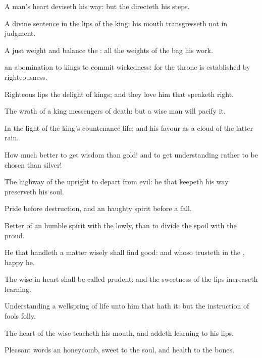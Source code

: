 {A
man’s
heart
deviseth his
way: but the
{}
directeth his
steps.

A divine
sentence
{} in the
lips of the
king: his
mouth
transgresseth not in
judgment.

A
just
weight and
balance
{} the
{}: all the
weights of the
bag
{} his
work.

 an
abomination to
kings to
commit
wickedness: for the
throne is
established by
righteousness.

Righteous
lips
{} the
delight of
kings; and they
love him that
speaketh
right.


\par }{\PP {}The
wrath of a
king
{}
messengers of
death: but a
wise
man will
pacify it.

In the
light of the
king’s
countenance
{}
life; and his
favour
{} as a
cloud of the latter
rain.

How much
better
{} to
get
wisdom than
gold! and to
get
understanding rather to be
chosen than
silver!

The
highway of the
upright
{} to
depart from
evil: he that
keepeth his
way
preserveth his
soul.

Pride
{}
before
destruction, and an
haughty
spirit
before a
fall.

Better
{} of an
humble
spirit with the
lowly, than to
divide the
spoil with the
proud.

He that handleth a
matter
wisely shall
find
good: and whoso
trusteth in the
{},
happy
{} he.

The
wise in
heart shall be
called
prudent: and the
sweetness of the
lips
increaseth
learning.

Understanding
{} a
wellspring of
life unto him that
hath it: but the
instruction of
fools
{}
folly.

The
heart of the
wise
teacheth his
mouth, and
addeth
learning to his
lips.

Pleasant
words
{} an
honeycomb,
sweet to the
soul, and
health to the
bones.

}

